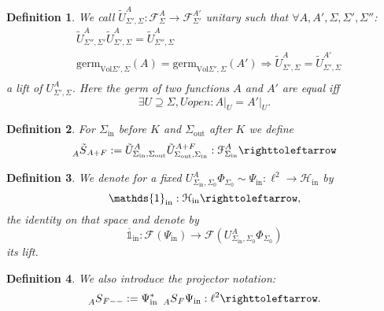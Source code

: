 \documentclass[oneside,reqno,12pt]{amsart}
\newtheorem{Def}{Definition}[section]
\begin{document}
\begin{Def}\label{lift}
We call \(\tilde{U}_{\Sigma',\Sigma}^A:\mathcal{F}_{\Sigma}^A\rightarrow\mathcal{F}_{\Sigma'}^{A'}\) unitary such that
\(\forall A, A', \Sigma, \Sigma', \Sigma''\):
\begin{align*}\label{func}\tag{func}
&\tilde{U}^A_{\Sigma'',\Sigma'}\tilde{U}^A_{\Sigma',\Sigma} = \tilde{U}^A_{\Sigma'',\Sigma}\\\label{loc}\tag{loc}
& \text{germ}_{\text{Vol}\Sigma',\Sigma}(A)=\text{germ}_{\text{Vol}\Sigma',\Sigma}(A')\Rightarrow \tilde{U}^A_{\Sigma',\Sigma}=\tilde{U}^{A'}_{\Sigma',\Sigma}\\\label{reg} \tag{reg}
&
\end{align*}
a lift of \(U^A_{\Sigma',\Sigma}\). Here the germ of two functions \(A\) and \(A'\) are equal iff
\begin{equation}
\exists U\supseteq \Sigma, U open: \left.A\right|_{U}=\left. A'\right|_{U}.
\end{equation}
\end{Def}

\begin{Def}
For \(\Sigma_{\text{in}}\) before \(K\) and \(\Sigma_{\text{out}}\) after \(K\) we define
\begin{equation}
\prescript{}{A}{\tilde{S}}_{A+F}:= \tilde{U}^A_{\Sigma_{\text{in}},\Sigma_{\text{out}}} \tilde{U}^{A+F}_{\Sigma_{\text{out}},\Sigma_{\text{in}}}:\mathcal{F}^A_{\Sigma_{\text{in}}}\righttoleftarrow
\end{equation}
\end{Def}

\begin{Def}
We denote for a fixed \( U_{\Sigma_{\text{in}},\Sigma_0}^A \Phi_{\Sigma_0}\sim \Psi_{\text{in}}:\ell^2 \rightarrow \mathcal{H}_{\text{in}}\) by
\begin{equation}
\mathds{1}_{\text{in}}:\mathcal{H}_{\text{in}}\righttoleftarrow,
\end{equation}
the identity on that space and denote by
\begin{equation}
\overline{\mathds{1}}_{\text{in}}:\mathcal{F}(\Psi_{\text{in}})\rightarrow\mathcal{F}(U_{\Sigma_{\text{in}},\Sigma_0}^A \Phi_{\Sigma_0})
\end{equation}
its lift.
\end{Def}


\begin{Def}
We also introduce the projector notation:
\begin{equation}
\prescript{}{A}{S}_{F --}:= \Psi_{\text{in}}^* ~\prescript{}{A}{S}_{F}\Psi_{\text{in}}: \ell^2 \righttoleftarrow.
\end{equation}
\end{Def}
\end{document}
